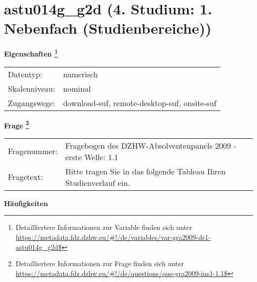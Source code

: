 
    \setcounter{footnote}{0}

    \vspace*{-1.8cm}
	\section{astu014g\_g2d (4. Studium: 1. Nebenfach (Studienbereiche))}
	\label{section:astu014g_g2d}



    \vspace*{0.5cm}
    \noindent\textbf{Eigenschaften
	\footnote{Detailliertere Informationen zur Variable finden sich unter
		\url{https://metadata.fdz.dzhw.eu/\#!/de/variables/var-gra2009-ds1-astu014g_g2d$}}}\\
	\begin{tabularx}{\hsize}{@{}lX}
	Datentyp: & numerisch \\
	Skalenniveau: & nominal \\
	Zugangswege: &
	  download-suf, 
	  remote-desktop-suf, 
	  onsite-suf
 \\
    \end{tabularx}



				\vspace*{0.5cm}
                \noindent\textbf{Frage
	                \footnote{Detailliertere Informationen zur Frage finden sich unter
		              \url{https://metadata.fdz.dzhw.eu/\#!/de/questions/que-gra2009-ins1-1.1$}}}\\
				\begin{tabularx}{\hsize}{@{}lX}
					Fragenummer: &
					  Fragebogen des DZHW-Absolventenpanels 2009 - erste Welle:
					  1.1
 \\
					Fragetext: & Bitte tragen Sie in das folgende Tableau Ihren Studienverlauf ein. \\
				\end{tabularx}





        		\vspace*{0.5cm}
                \noindent\textbf{Häufigkeiten}

